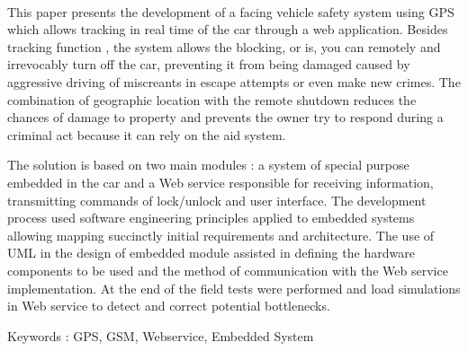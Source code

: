 \\[2cm]
This paper presents the development of a facing vehicle safety system using GPS which allows tracking in real time of the car through a web application. Besides tracking function , the system allows the blocking, or is, you can remotely and irrevocably turn off the car, preventing it from being damaged caused by aggressive driving of miscreants in escape attempts or even make new crimes. The combination of geographic location with the remote shutdown reduces the chances of damage to property and prevents the owner try to respond during a criminal act because it can rely on the aid system.

The solution is based on two main modules : a system of special purpose embedded in the car and a Web service responsible for receiving information, transmitting commands of lock/unlock and user interface. The development process used software engineering principles applied to embedded systems allowing mapping succinctly initial requirements and architecture. The use of UML in the design of embedded module assisted in defining the hardware components to be used and the method of communication with the Web service implementation. At the end of the field tests were performed and load simulations in Web service to detect and correct potential bottlenecks.


Keywords : GPS, GSM, Webservice, Embedded System
